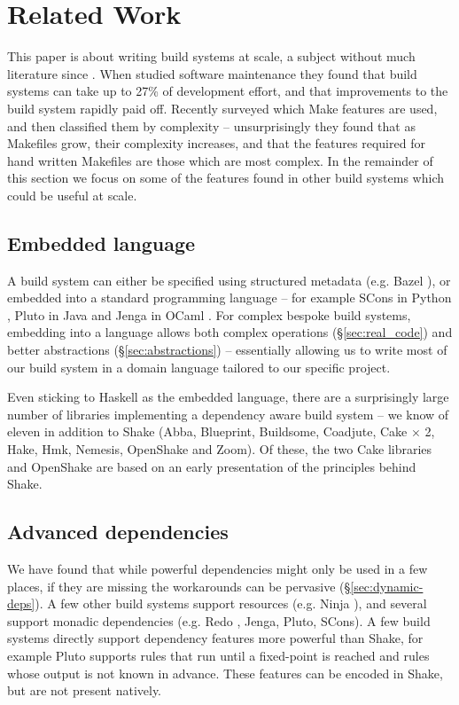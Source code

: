 \section{Related Work\label{section-review}}

This paper is about writing build systems at scale, a subject without much
literature since \citet{miller:recursive_make}. When
\citet{mcintosh:build_maintenance_effort} studied software maintenance they
found that build systems can take up to 27\% of
development effort, and that improvements to the build system rapidly paid off.
Recently \citet{martin:make_it_simple} surveyed which Make features are used,
and then \citet{martin:maintenance_complexity_makefiles} classified them by
complexity -- unsurprisingly they found that as Makefiles grow, their complexity
increases, and that the features required for hand written Makefiles are those
which are most complex. In the remainder of this section we focus on some of the
features found in other build systems which could be useful at scale.

\subsection{Embedded language}

A build system can either be specified using structured metadata (e.g. Bazel \cite{bazel}), or embedded into a standard programming language -- for example SCons in Python \cite{scons}, Pluto in Java \cite{pluto} and Jenga in OCaml \cite{jenga}. For complex bespoke build systems, embedding into a language allows both complex operations (\S\ref{sec:real_code}) and better abstractions (\S\ref{sec:abstractions}) -- essentially allowing us to write most of our build system in a domain language tailored to our specific project.

Even sticking to Haskell as the embedded language, there are a surprisingly large number of libraries implementing a dependency aware build system -- we know of eleven in addition to Shake (Abba, Blueprint, Buildsome, Coadjute, Cake $\times$ 2, Hake, Hmk, Nemesis, OpenShake and Zoom). Of these, the two Cake libraries and OpenShake are based on an early presentation of the principles behind Shake.

\subsection{Advanced dependencies}

We have found that while powerful dependencies might only be used in a few places, if they are missing the workarounds can be pervasive (\S\ref{sec:dynamic-deps}). A few other build systems support resources (e.g. Ninja \cite{ninja}), and several support monadic dependencies (e.g. Redo \cite{redo}, Jenga, Pluto, SCons). A few build systems directly support dependency features more powerful than Shake, for example Pluto supports rules that run until a fixed-point is reached and rules whose output is not known in advance. These features can be encoded in Shake, but are not present natively.

